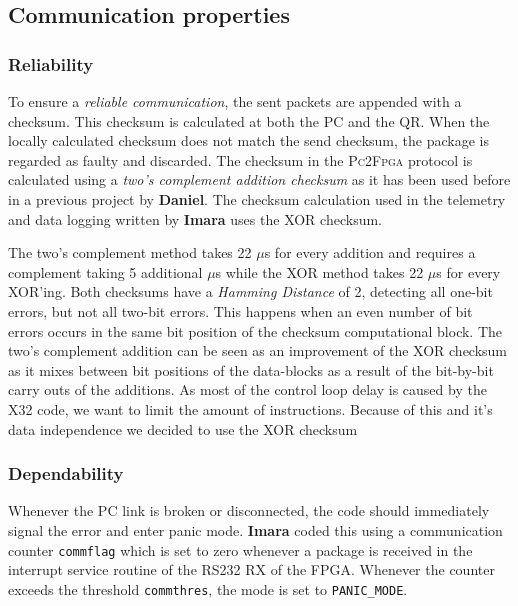 \documentclass{article}
\begin{document}
\subsection{Communication properties}
\subsubsection{Reliability} 
To ensure a \emph{reliable communication}, the sent packets are appended with a checksum.  This checksum is calculated at both the PC and the QR. When the locally calculated checksum does not match the send checksum, the package is regarded as faulty and discarded. The checksum in the \textsc{Pc2Fpga} protocol is calculated using a \emph{two's complement addition checksum} as it has been used before in a previous project by \textbf{Daniel}. The checksum calculation used in the telemetry and data logging written by \textbf{Imara} uses the \textsc{XOR} checksum.  

The two's complement method takes 22 $\mu$s for every addition and requires a complement taking 5 additional $\mu$s while the \textsc{XOR} method takes 22 $\mu$s for every \textsc{XOR}'ing. Both checksums have a \emph{Hamming Distance} of 2, detecting all one-bit errors, but not all two-bit errors. This happens when an even number of bit errors occurs in the same bit position of the checksum computational block. The two's complement addition can be seen as an improvement of the \textsc{XOR} checksum as it mixes between bit positions of the data-blocks as a result of the bit-by-bit carry outs of the additions. As most of the control loop delay is caused by the X32 code, we want to limit the amount of instructions. Because of this and it's data independence we decided to use the \textsc{XOR} checksum 

\subsubsection{Dependability}
Whenever the PC link is broken or disconnected, the code should immediately signal the error and enter panic mode. \textbf{Imara} coded this using a communication counter \texttt{commflag} which is set to zero whenever a package is received in the interrupt service routine of the RS232 RX of the FPGA. Whenever the counter exceeds the threshold \texttt{commthres}, the mode is set to \texttt{PANIC\_MODE}. 
\end{document}
